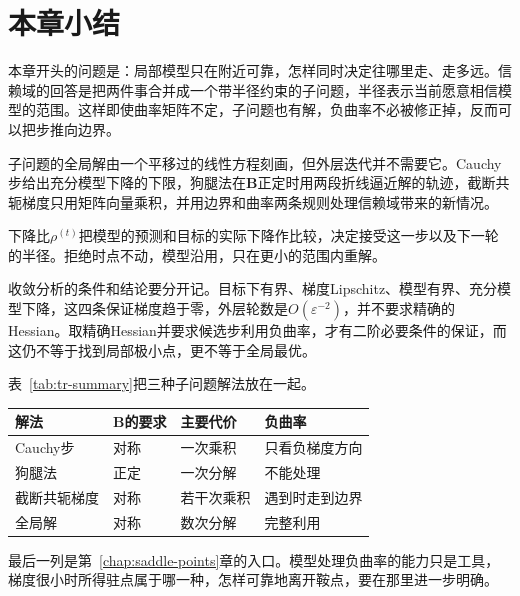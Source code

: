 \section{本章小结}
\label{sec:tr-summary}

本章开头的问题是：局部模型只在附近可靠，怎样同时决定往哪里走、走多远。信赖域的回答是把两件事合并成一个带半径约束的子问题，半径表示当前愿意相信模型的范围。这样即使曲率矩阵不定，子问题也有解，负曲率不必被修正掉，反而可以把步推向边界。

子问题的全局解由一个平移过的线性方程刻画，但外层迭代并不需要它。Cauchy步给出充分模型下降的下限，狗腿法在$\bm{B}$正定时用两段折线逼近解的轨迹，截断共轭梯度只用矩阵向量乘积，并用边界和曲率两条规则处理信赖域带来的新情况。

下降比$\rho^{(t)}$把模型的预测和目标的实际下降作比较，决定接受这一步以及下一轮的半径。拒绝时点不动，模型沿用，只在更小的范围内重解。

收敛分析的条件和结论要分开记。目标下有界、梯度Lipschitz、模型有界、充分模型下降，这四条保证梯度趋于零，外层轮数是$O(\varepsilon^{-2})$，并不要求精确的Hessian。取精确Hessian并要求候选步利用负曲率，才有二阶必要条件的保证，而这仍不等于找到局部极小点，更不等于全局最优。

表~\ref{tab:tr-summary}把三种子问题解法放在一起。

\begin{BookInlineTable}
 \centering
 \begin{tabular}{llll}
  \toprule
  解法 & $\bm{B}$的要求 & 主要代价 & 负曲率\\
  \midrule
  Cauchy步 & 对称 & 一次乘积 & 只看负梯度方向\\
  狗腿法 & 正定 & 一次分解 & 不能处理\\
  截断共轭梯度 & 对称 & 若干次乘积 & 遇到时走到边界\\
  全局解 & 对称 & 数次分解 & 完整利用\\
  \bottomrule
 \end{tabular}
 \caption{子问题几种解法的对照。}
 \label{tab:tr-summary}
\end{BookInlineTable}

最后一列是第~\ref{chap:saddle-points}章的入口。模型处理负曲率的能力只是工具，梯度很小时所得驻点属于哪一种，怎样可靠地离开鞍点，要在那里进一步明确。
